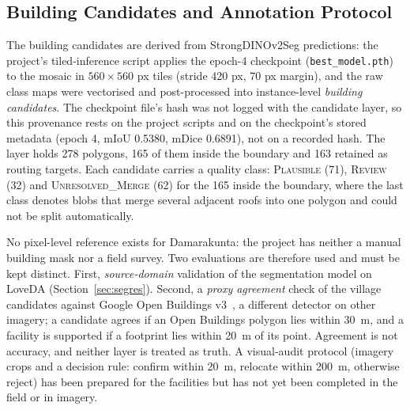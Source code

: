 \documentclass[journal]{IEEEtran}
\begin{document}
\subsection{Building Candidates and Annotation Protocol}
The building candidates are derived from StrongDINOv2Seg predictions: the project's tiled-inference script applies the epoch-4 checkpoint (\texttt{best\_model.pth}) to the mosaic in $560\times560$ px tiles (stride 420 px, 70 px margin), and the raw class maps were vectorised and post-processed into instance-level \emph{building candidates}. The checkpoint file's hash was not logged with the candidate layer, so this provenance rests on the project scripts and on the checkpoint's stored metadata (epoch 4, mIoU 0.5380, mDice 0.6891), not on a recorded hash. The layer holds 278 polygons, 165 of them inside the boundary and 163 retained as routing targets. Each candidate carries a quality class: \textsc{Plausible} (71), \textsc{Review} (32) and \textsc{Unresolved\_Merge} (62) for the 165 inside the boundary, where the last class denotes blobs that merge several adjacent roofs into one polygon and could not be split automatically.

No pixel-level reference exists for Damarakunta: the project has neither a manual building mask nor a field survey. Two evaluations are therefore used and must be kept distinct. First, \emph{source-domain} validation of the segmentation model on LoveDA (Section~\ref{sec:segres}). Second, a \emph{proxy agreement} check of the village candidates against Google Open Buildings v3~\cite{sirko2021openbuildings}, a different detector on other imagery; a candidate agrees if an Open Buildings polygon lies within 30~m, and a facility is supported if a footprint lies within 20~m of its point. Agreement is not accuracy, and neither layer is treated as truth. A visual-audit protocol (imagery crops and a decision rule: confirm within 20~m, relocate within 200~m, otherwise reject) has been prepared for the facilities but has not yet been completed in the field or in imagery.

\end{document}
